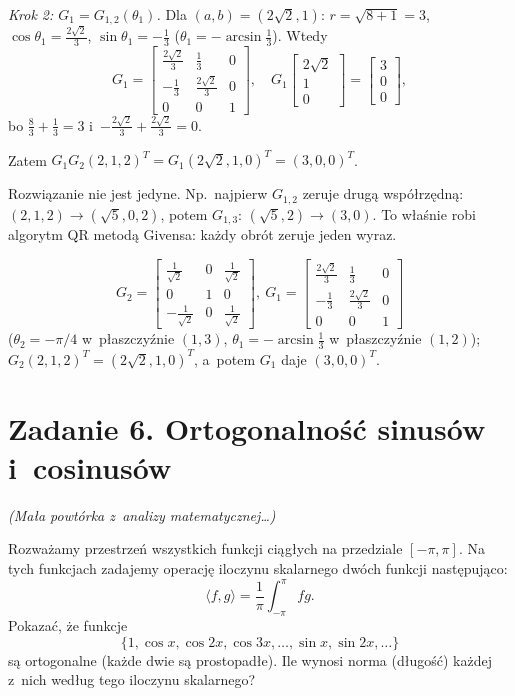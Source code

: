 \documentclass[11pt]{article}
\begin{document}
\emph{Krok 2: $G_1=G_{1,2}(\theta_1)$.} Dla $(a,b)=(2\sqrt2,1)$:
$r=\sqrt{8+1}=3$, $\cos\theta_1=\frac{2\sqrt2}3$, $\sin\theta_1=-\frac13$
($\theta_1=-\arcsin\frac13$). Wtedy
\[
G_1=\begin{bmatrix}\frac{2\sqrt2}3&\frac13&0\\[2pt]-\frac13&\frac{2\sqrt2}3&0
\\[2pt]0&0&1\end{bmatrix},\quad
G_1\begin{bmatrix}2\sqrt2\\1\\0\end{bmatrix}=\begin{bmatrix}3\\0\\0\end{bmatrix},
\]
bo $\frac{8}{3}+\frac13=3$ i~$-\frac{2\sqrt2}3+\frac{2\sqrt2}3=0$.

Zatem $G_1G_2(2,1,2)^T=G_1(2\sqrt2,1,0)^T=(3,0,0)^T$.

\begin{uwaga}
Rozwiązanie nie jest jedyne. Np.\ najpierw $G_{1,2}$ zeruje drugą
współrzędną: $(2,1,2)\to(\sqrt5,0,2)$, potem $G_{1,3}$:
$(\sqrt5,2)\to(3,0)$. To właśnie robi algorytm QR metodą Givensa: każdy
obrót zeruje jeden wyraz.
\end{uwaga}

\begin{odpowiedz}
\[
G_2=\begin{bmatrix}\frac1{\sqrt2}&0&\frac1{\sqrt2}\\[2pt]0&1&0\\[2pt]
-\frac1{\sqrt2}&0&\frac1{\sqrt2}\end{bmatrix},\
G_1=\begin{bmatrix}\frac{2\sqrt2}3&\frac13&0\\[2pt]-\frac13&\frac{2\sqrt2}3&0
\\[2pt]0&0&1\end{bmatrix}
\]
($\theta_2=-\pi/4$ w~płaszczyźnie $(1,3)$, $\theta_1=-\arcsin\frac13$
w~płaszczyźnie $(1,2)$); $G_2(2,1,2)^T=(2\sqrt2,1,0)^T$, a~potem
$G_1$ daje $(3,0,0)^T$.
\end{odpowiedz}

\section{Zadanie 6. Ortogonalność sinusów i~cosinusów}
\begin{tresc}
\emph{(Mała powtórka z~analizy matematycznej\ldots)}

Rozważamy przestrzeń wszystkich funkcji ciągłych na przedziale
$[-\pi,\pi]$. Na tych funkcjach zadajemy operację iloczynu skalarnego
dwóch funkcji następująco:
\[
\langle f,g\rangle=\frac1\pi\int_{-\pi}^{\pi}fg.
\]
Pokazać, że funkcje
\[
\{1,\cos x,\cos2x,\cos3x,\ldots,\sin x,\sin2x,\ldots\}
\]
są ortogonalne (każde dwie są prostopadłe). Ile wynosi norma (długość)
każdej z~nich według tego iloczynu skalarnego?
\end{tresc}
\end{document}
